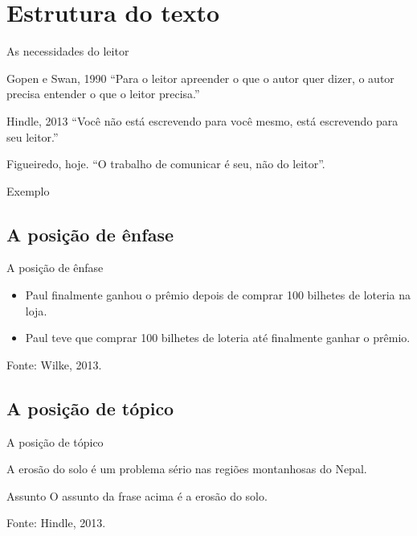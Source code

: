\documentclass{beamer}
\begin{document}
\section{Estrutura do texto}

\begin{frame}{As necessidades do leitor}
  \begin{block}{Gopen e Swan, 1990}
    ``Para o leitor apreender o que o autor quer dizer, o autor
    precisa entender o que o leitor precisa.''
  \end{block}
  \begin{block}{Hindle, 2013}
    ``Você não está escrevendo para você mesmo, está escrevendo para
    seu leitor.''
  \end{block}
  \begin{block}{Figueiredo, hoje.}
    ``O trabalho de comunicar é seu, não do leitor''.
  \end{block}
\end{frame}

\begin{frame}{Exemplo}
\end{frame}

\subsection{A posição de ênfase}

\begin{frame}{A posição de ênfase}
  \begin{example}
    \begin{itemize}
    \item Paul finalmente ganhou o prêmio depois de comprar 100
      bilhetes de loteria \alert<3->{na loja}.
    \item<4> Paul teve que comprar 100 bilhetes de loteria até finalmente
      \alert<5->{ganhar o prêmio}.
    \end{itemize}
  \end{example}
  Fonte: Wilke, 2013.
\end{frame}

\subsection{A posição de tópico}

\begin{frame}{A posição de tópico}
  \begin{example}
    A \alert<3->{erosão do solo} é um problema sério nas regiões
    montanhosas do Nepal.
  \end{example}
  \begin{block}{Assunto}
    O assunto da frase acima é a \alert<3->{erosão do solo}.
  \end{block}

  Fonte: Hindle, 2013.
\end{frame}
\end{document}
